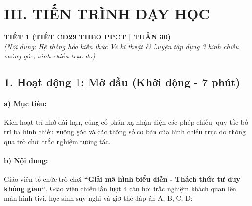 \documentclass[12pt, a4paper]{article}
\begin{document}
\section*{III. TIẾN TRÌNH DẠY HỌC}

\begin{center}
    \textbf{\large TIẾT 1 (TIẾT CĐ29 THEO PPCT | TUẦN 30)}\\[4pt]
    \textit{(Nội dung: Hệ thống hóa kiến thức Vẽ kĩ thuật \& Luyện tập dựng 3 hình chiếu vuông góc, hình chiếu trục đo)}
\end{center}

\subsection*{1. Hoạt động 1: Mở đầu (Khởi động - 7 phút)}

\paragraph{a) Mục tiêu:} Kích hoạt trí nhớ dài hạn, củng cố phản xạ nhận diện các phép chiếu, quy tắc bố trí ba hình chiếu vuông góc và các thông số cơ bản của hình chiếu trục đo thông qua trò chơi trắc nghiệm tương tác.

\paragraph{b) Nội dung:} Giáo viên tổ chức trò chơi \textbf{``Giải mã hình biểu diễn - Thách thức tư duy không gian''}. Giáo viên chiếu lần lượt 4 câu hỏi trắc nghiệm khách quan lên màn hình tivi, học sinh suy nghĩ và giơ thẻ đáp án A, B, C, D:
\end{document}
